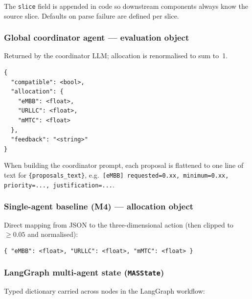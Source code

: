 \noindent
The \texttt{slice} field is appended in code so downstream components always
know the source slice. Defaults on parse failure are defined per slice.

\subsubsection*{Global coordinator agent --- evaluation object}

Returned by the coordinator LLM; allocation is renormalised to sum to~1.

\begin{lstlisting}[basicstyle=\footnotesize\ttfamily, breaklines=true, columns=fullflexible, frame=single]
{
  "compatible": <bool>,
  "allocation": {
    "eMBB": <float>,
    "URLLC": <float>,
    "mMTC": <float>
  },
  "feedback": "<string>"
}
\end{lstlisting}

\noindent
When building the coordinator prompt, each proposal is flattened to one line of
text for \texttt{\{proposals\_text\}}, e.g.\
\texttt{[eMBB] requested=0.xx, minimum=0.xx, priority=..., justification=...}.

\subsubsection*{Single-agent baseline (M4) --- allocation object}

Direct mapping from JSON to the three-dimensional action (then clipped to
$\geq 0.05$ and normalised):

\begin{lstlisting}[basicstyle=\footnotesize\ttfamily, breaklines=true, columns=fullflexible, frame=single]
{ "eMBB": <float>, "URLLC": <float>, "mMTC": <float> }
\end{lstlisting}

\subsubsection*{LangGraph multi-agent state (\texttt{MASState})}

Typed dictionary carried across nodes in the LangGraph workflow:

